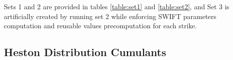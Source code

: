 \documentclass[12,twoside]{mammeTFM}
\theoremstyle{definition}
\theoremstyle{remark}
\begin{document}
Sets 1 and 2 are provided in tables \ref{table:set1} and \ref{table:set2}, and Set 3 is artificially created by running set 2 while enforcing SWIFT parameters computation and reusable values precomputation for each strike.

\subsection{Heston Distribution Cumulants}\label{app:cumulants}
\end{document}
